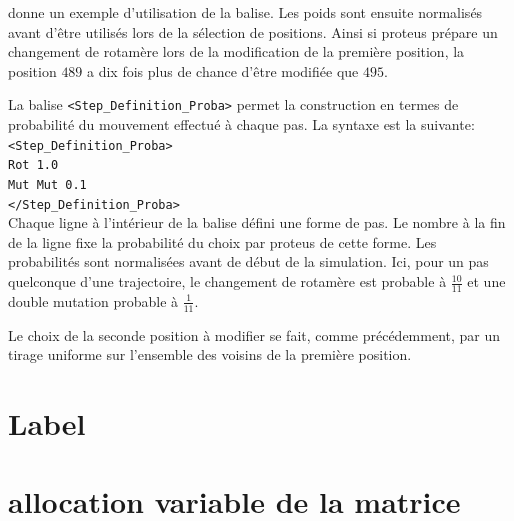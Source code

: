 donne un exemple d'utilisation de la balise. Les poids sont ensuite normalisés avant d'être utilisés lors de la sélection de positions. Ainsi si proteus prépare un changement de rotamère lors de la modification de la première position, la position $489$ a dix fois plus de chance d'être modifiée que $495$.

La balise \verb!<Step_Definition_Proba>! permet la construction en termes de probabilité du mouvement effectué à chaque pas. La syntaxe est la suivante:\\

\verb!<Step_Definition_Proba>! \\
\verb!Rot 1.0! \\
\verb!Mut Mut 0.1! \\
\verb!</Step_Definition_Proba>! \\

Chaque ligne à l'intérieur de la balise défini une forme de pas. Le nombre à la fin de la ligne fixe la probabilité du choix par proteus de cette forme. Les probabilités sont normalisées avant de début de la simulation. Ici, pour un pas quelconque d'une trajectoire, le changement de rotamère est probable à $\frac{10}{11}$ et une double mutation probable à $\frac{1}{11}$.

Le choix de la seconde position à modifier se fait, comme précédemment, par un tirage uniforme sur l'ensemble des voisins de la première position.


\section{Label}
\section{allocation variable de la matrice}

\clearpage


